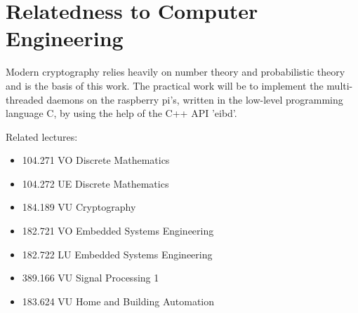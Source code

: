 \documentclass[a4paper,12pt,twoside]{memoir}
\begin{document}
 
\section{Relatedness to Computer Engineering}

Modern cryptography relies heavily on number theory and probabilistic theory and is the basis of this work.
The practical work will be to implement the multi-threaded daemons on the raspberry pi's, written in the low-level programming language
C, by using the help of the C++ API 'eibd'.

Related lectures:

\begin{itemize}
 \item 104.271 VO Discrete Mathematics 
 \item 104.272 UE Discrete Mathematics 
 \item 184.189 VU Cryptography 
 \item 182.721 VO Embedded Systems Engineering 
 \item 182.722 LU Embedded Systems Engineering 
 \item 389.166 VU Signal Processing 1
 \item 183.624 VU Home and Building Automation 

\end{itemize}

\printbibliography



  
    
    
%
\end{document}

